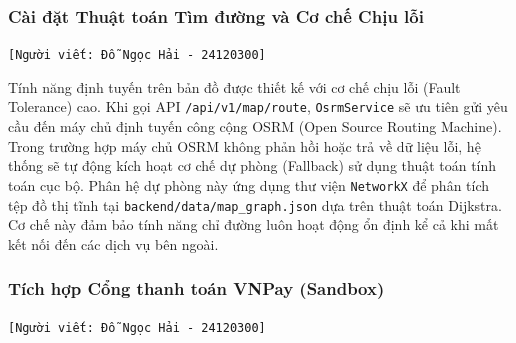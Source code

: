 \subsubsection{Cài đặt Thuật toán Tìm đường và Cơ chế Chịu lỗi}
\texttt{[Người viết: Đỗ Ngọc Hải - 24120300]}

Tính năng định tuyến trên bản đồ được thiết kế với cơ chế chịu lỗi (Fault Tolerance) cao. Khi gọi API \texttt{/api/v1/map/route}, \texttt{OsrmService} sẽ ưu tiên gửi yêu cầu đến máy chủ định tuyến công cộng OSRM (Open Source Routing Machine). Trong trường hợp máy chủ OSRM không phản hồi hoặc trả về dữ liệu lỗi, hệ thống sẽ tự động kích hoạt cơ chế dự phòng (Fallback) sử dụng thuật toán tính toán cục bộ. Phân hệ dự phòng này ứng dụng thư viện \texttt{NetworkX} để phân tích tệp đồ thị tĩnh tại \texttt{backend/data/map\_graph.json} dựa trên thuật toán Dijkstra. Cơ chế này đảm bảo tính năng chỉ đường luôn hoạt động ổn định kể cả khi mất kết nối đến các dịch vụ bên ngoài.

\subsubsection{Tích hợp Cổng thanh toán VNPay (Sandbox)}
\texttt{[Người viết: Đỗ Ngọc Hải - 24120300]}

